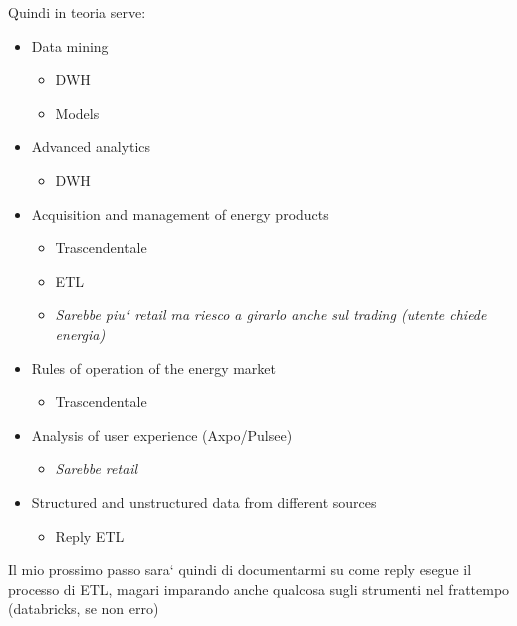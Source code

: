         Quindi in teoria serve:
        \begin{itemize}
            \item Data mining
            \begin{itemize}
                \item DWH
                \item Models
            \end{itemize}
            
            \item Advanced analytics
            \begin{itemize}
                \item DWH
            \end{itemize}
            
            \item Acquisition and management of energy products
            \begin{itemize}
                \item Trascendentale
                \item ETL
                \item \textit{Sarebbe piu` retail ma riesco a girarlo anche sul trading (utente chiede energia)}
            \end{itemize}
            
            \item Rules of operation of the energy market
            \begin{itemize}
                \item Trascendentale
            \end{itemize}
            
            \item Analysis of user experience (Axpo/Pulsee)
            \begin{itemize}
                \item \textit{Sarebbe retail}
            \end{itemize}
            
            \item Structured and unstructured data from different sources
            \begin{itemize}
                \item Reply ETL
            \end{itemize}
        \end{itemize}
        
        Il mio prossimo passo sara` quindi di documentarmi su come reply esegue il processo di ETL, magari imparando anche qualcosa sugli strumenti nel frattempo (databricks, se non erro)